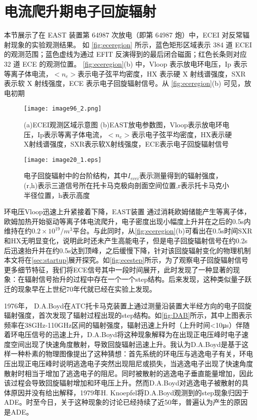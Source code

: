 \section{电流爬升期电子回旋辐射}
    本节展示了在 EAST 装置第 64987 次放电（即第 64987 炮）中，ECEI 对反常辐射现象的实验观测结果。 如 \autoref{fig:eceregion} 所示，蓝色矩形区域表示 384 道 ECEI 的观测范围；蓝色虚线为通过 EFIT 反演得到的最后闭合磁面；红色长条则对应 32 道 ECE 的观测位置。 \autoref{fig:eceregion}(b) 中，Vloop 表示放电环电压，Ip 表示等离子体电流，$<n_e>$表示电子弦平均密度，HX 表示硬 X 射线谱强度，SXR 表示软 X 射线强度，ECE 表示电子回旋辐射信号。从 \autoref{fig:eceregion}(b) 可见，放电初期
\begin{figure}[ht]
\centering
\texttt{[image: image96\_2.png]}
\caption{\label{fig:eceregion}(a)ECEI观测区域示意图 (b)EAST放电参数图，Vloop表示放电环电压，Ip表示等离子体电流，$<n_e>$表示电子弦平均密度，HX表示硬X射线谱强度，SXR表示软X射线强度，ECE表示电子回旋辐射信号}
\end{figure}
\begin{figure}[ht]
\centering
\texttt{[image: image20\_1.eps]}
\caption{\label{fig:ecestep}电子回旋辐射中的台阶结构，其中$I_{ecei}$表示测量得到的辐射强度，(r,h)表示三道信号所在托卡马克极向剖面空间位置,r表示托卡马克小半径位置，h表示高度}
\end{figure}
环电压Vloop迅速上升紧接着下降，EAST装置 通过消耗欧姆储能产生等离子体，欧姆加热开始驱动等离子体电流爬升，电子密度出现小幅度上升并在之后的0.5s内维持在约$0.2\times10^{19}/m^3$平台。与此同时，从\autoref{fig:eceregion}(b)可看出在0.5s时间SXR和HX无明显变化，说明此时还未产生高能电子，但是电子回旋辐射信号在约0.2s后迅速抬升并在约0.5s达到顶峰，之后缓慢下降，针对该回旋辐射变化的物理机制本文将在\autoref{sec:startup}展开探究。如\autoref{fig:ecestep}所示，为了观察电子回旋辐射信号更多细节特征，我们将ECE信号其中一段时间展开，此时发现了一种显著的现象：在辐射信号抬升的过程中存在一个一个step结构。后来发现，这种类似量子跃迁的现象早在上世纪70年代就已经在实验上发现\cite{RN725}。\par
1976年， D.A.Boyd\cite{RN725}在ATC托卡马克装置上通过测量沿装置大半经方向的电子回旋辐射强度，首次发现了辐射过程出现的step结构。如\autoref{fig:DAB}所示，其中上图表示频率在38GHz-110GHz区间的辐射强度，辐射迅速上升时（上升时间<10μs）伴随着环电压信号的迅速上升，D.A.Boyd将这种现象解释为在出现正电压峰时电子速度空间出现了快速角度散射，导致回旋辐射迅速上升。我认为D.A.Boyd是基于这样一种朴素的物理图像提出了这种猜想：首先系统的环电压与逃逸电子有关，环电压出现正电压峰时说明逃逸电子突然出现阻尼或损失，当逃逸电子出现了快速角度散射时相当于增加了逃逸电子的阻尼。同时被散射的逃逸电子垂直能量增加，因此该过程会导致回旋辐射增加和环电压上升。然而D.A.Boyd对逃逸电子被散射的具体原因并没有给出解释，1979年H. Knoepfel将D.A.Boyd观测到的step现象归因于ADE\cite{RN1030}。时至今日，关于这种现象的讨论已经持续了近50年\cite{RN1863,RN964,RN786,RN1866,RN1554,RN2102,RN1868,RN975,RN1859,RN798}，普遍认为产生的原因是ADE。
